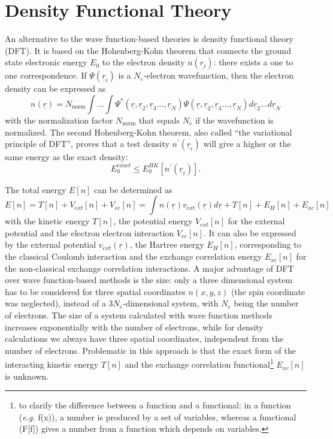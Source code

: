 \documentclass[11pt,DIV=13,BCOR=5mm,a4paper,headinclude]{scrbook}
\renewcommand{\vec}[1]{\underline{#1}}
\begin{document}
\section{Density Functional Theory}
An alternative to the wave function-based theories is density functional theory (DFT).
It is based on the Hohenberg-Kohn theorem\cite{Hohenberg-Kohn1964} that connects the ground state electronic energy $E_0$ to the electron density $n(\vec{r_i})$: there exists a one to one correspondence.
If $\Psi(\vec{r}_i)$ is a $N_e$-electron wavefunction, then the  electron density can be expressed as
\begin{equation}\label{eq:electron-density}
 n(\vec{r})=N_\textrm{norm}\int ...
\int \Psi^\ast(\vec{r},\vec{r}_2,\vec{r}_3...,\vec{r}_N)\Psi(\vec{r},\vec{r}_2,\vec{r}_3...,\vec{r}_N) d \vec{r}_2...d \vec{r}_N
\end{equation}
with the normalization factor $N_\textrm{norm}$ that equals $N_e$ if the wavefunction is normalized.
The second Hohenberg-Kohn theorem, also called ``the variational principle of DFT'', proves that a test density $n^\prime(\vec{r}_i)$ will give a higher or the same energy as the exact density:
\begin{equation}
 E_0^{exact}\leq E_0^{HK}[n^\prime(\vec{r}_i)].
\end{equation}


The total energy $E[n]$ can be determined as
\begin{equation}
 E[n]=T[n] + V_{ext}[n] + V_{ee}[n]=\int n(\vec{r})v_{ext}(\vec{r})d\vec{r} + T[n]+E_H[n]+E_{xc}[n]
\end{equation}
with the kinetic energy $T[n]$, the potential energy $V_{ext}[n]$ for the external potential and the electron electron interaction $V_{ee}[n]$.
It can also be expressed by the external potential $v_{ext}(\vec{r})$, the Hartree energy $E_H[n]$, corresponding to the classical Coulomb interaction and the exchange correlation energy $E_{xc}[n]$ for the non-classical exchange correlation interactions.
A major advantage of DFT over wave function-based methods is the size: only a three dimensional system has to be considered for three spatial coordinates $n(x,y,z)$ (the spin coordinate was neglected), instead of a $3N_e$-dimensional system, %
with $N_e$ being the number of electrons.
The size of a system calculated with wave function methods increases exponentially with the number of electrons, while for density calculations we always have three spatial coordinates, independent from the number of electrons.
Problematic in this approach is that the exact form of the interacting kinetic energy $T[n]$ and the exchange correlation functional\footnote{to clarify the difference between a function and a functional: in a function (\textit{e.g.} f(x)), a number is produced by a set of variables, whereas a functional (F[f]) gives a number from a function which depends on variables.} $E_{xc}[n]$ is unknown.
\end{document}
